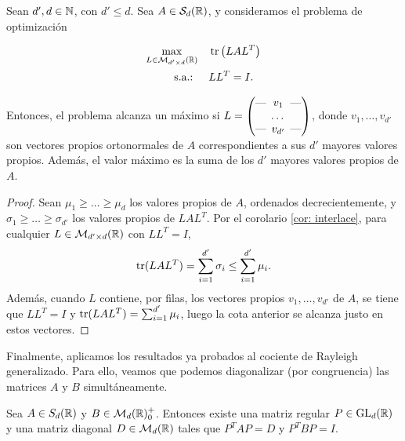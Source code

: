 \begin{thm} \label{thm:eigen_trace_opt}
    Sean $d',d \in \mathbb{N} $, con $d' \le d$. Sea $A \in \mathcal{S}_d(\mathbb{R})$, y consideramos el problema de optimización
    
    \begin{align*}
    \max_{L \in \mathcal{M}_{d'\times d}(\mathbb{R})} &\quad \operatorname{tr}\left(LAL^T\right)  \\
    \text{s.a.: } &\quad LL^T = I.
    \end{align*}
    
    Entonces, el problema alcanza un máximo si $L = \begin{pmatrix}
    \text{---} \hspace{-0.2cm} & v_1 & \hspace{-0.2cm} \text{---} \\
    & \dots &  \\
    \text{---} \hspace{-0.2cm} & v_{d'} & \hspace{-0.2cm} \text{---}
    \end{pmatrix}$, donde $v_1,\dots,v_{d'}$ son vectores propios ortonormales de $A$ correspondientes a sus $d'$ mayores valores propios. Además, el valor máximo es la suma de los $d'$ mayores valores propios de $A$.
    
    
\end{thm}

\begin{proof}
    Sean $\mu_1 \ge \dots \ge \mu_d$ los valores propios de $A$, ordenados decrecientemente, y $\sigma_1 \ge \dots \ge \sigma_{d'}$ los valores propios de $LAL^T$. Por el corolario \ref{cor: interlace}, para cualquier $L \in \mathcal{M}_{d' \times d}(\mathbb{R})$ con $LL^T = I$,
    \[ \operatorname{tr}(LAL^T) = \sum_{i=1}^{d'} \sigma_i \le \sum_{i=1}^{d'} \mu_i. \]
    Además, cuando $L$ contiene, por filas, los vectores propios $v_1,\dots,v_{d'}$ de $A$, se tiene que $LL^T = I$ y $\operatorname{tr}(LAL^T) = \sum_{i=1}^{d'}\mu_i$, luego la cota anterior se alcanza justo en estos vectores.
\end{proof}

Finalmente, aplicamos los resultados ya probados al cociente de Rayleigh generalizado. Para ello, veamos que podemos diagonalizar (por congruencia) las matrices $A$ y $B$ simultáneamente.

\begin{lem}
    Sea $A \in S_d(\mathbb{R})$ y $B \in \mathcal{M}_d(\mathbb{R})^+_0$. Entonces existe una matriz regular $P \in \operatorname{GL}_d(\mathbb{R})$ y una matriz diagonal $D \in \mathcal{M}_d(\mathbb{R})$ tales que $P^TAP = D$ y $P^TBP = I$.
\end{lem}

